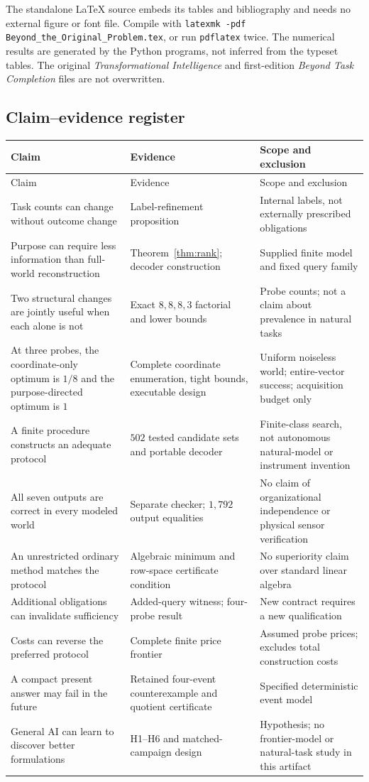 \documentclass[11pt,letterpaper]{article}
\theoremstyle{remark}\newtheorem{remark}{Remark}[section]
\begin{document}
The standalone \LaTeX{} source embeds its tables and bibliography and needs no external figure or font file. Compile with \texttt{latexmk -pdf Beyond\_the\_Original\_Problem.tex}, or run \texttt{pdflatex} twice. The numerical results are generated by the Python programs, not inferred from the typeset tables. The original \emph{Transformational Intelligence} and first-edition \emph{Beyond Task Completion} files are not overwritten.

\clearpage
\subsection{Claim--evidence register}
\small
\begin{longtable}{@{}P{.29\linewidth}P{.34\linewidth}P{.31\linewidth}@{}}
\toprule
Claim & Evidence & Scope and exclusion\\
\midrule
\endfirsthead
\toprule
Claim & Evidence & Scope and exclusion\\
\midrule
\endhead
Task counts can change without outcome change & Label-refinement proposition & Internal labels, not externally prescribed obligations\\
Purpose can require less information than full-world reconstruction & Theorem~\ref{thm:rank}; decoder construction & Supplied finite model and fixed query family\\
Two structural changes are jointly useful when each alone is not & Exact $8,8,8,3$ factorial and lower bounds & Probe counts; not a claim about prevalence in natural tasks\\
At three probes, the coordinate-only optimum is $1/8$ and the purpose-directed optimum is $1$ & Complete coordinate enumeration, tight bounds, executable design & Uniform noiseless world; entire-vector success; acquisition budget only\\
A finite procedure constructs an adequate protocol & $502$ tested candidate sets and portable decoder & Finite-class search, not autonomous natural-model or instrument invention\\
All seven outputs are correct in every modeled world & Separate checker; $1{,}792$ output equalities & No claim of organizational independence or physical sensor verification\\
An unrestricted ordinary method matches the protocol & Algebraic minimum and row-space certificate condition & No superiority claim over standard linear algebra\\
Additional obligations can invalidate sufficiency & Added-query witness; four-probe result & New contract requires a new qualification\\
Costs can reverse the preferred protocol & Complete finite price frontier & Assumed probe prices; excludes total construction costs\\
A compact present answer may fail in the future & Retained four-event counterexample and quotient certificate & Specified deterministic event model\\
General AI can learn to discover better formulations & H1--H6 and matched-campaign design & Hypothesis; no frontier-model or natural-task study in this artifact\\
\bottomrule
\end{longtable}
\end{document}
